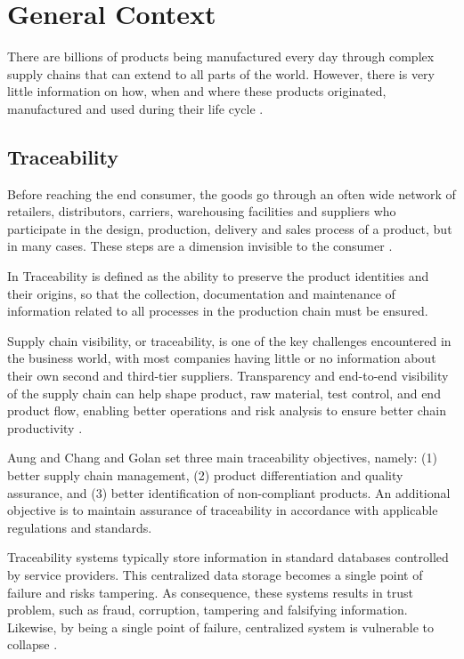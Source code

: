 \section{General Context} \label{sec:General}

There are billions of products being manufactured every day through complex supply chains that can extend to all parts of the world. However, there is very little information on how, when and where these products originated, manufactured and used during their life cycle \cite{horiuchirastreabilidade}.

\subsection{Traceability}\label{sec:traceability}

Before reaching the end consumer, the goods go through an often wide network of retailers, distributors, carriers, warehousing facilities and suppliers who participate in the design, production, delivery and sales process of a product, but in many cases. These steps are a dimension invisible to the consumer \cite{provenance2015}.

In \cite{gryna1998juran, Opara2001} Traceability is defined as the ability to preserve the product identities and their origins, so that the collection, documentation and maintenance of information related to all processes in the production chain must be ensured.

Supply chain visibility, or traceability, is one of the key challenges encountered in the business world, with most companies having little or no information about their own second and third-tier suppliers. Transparency and end-to-end visibility of the supply chain can help shape product, raw material, test control, and end product flow, enabling better operations and risk analysis to ensure better chain productivity \cite{abeyratne2016blockchain}.

Aung and Chang \cite{aung2014traceability} and Golan \cite{golan2004traceability} set three main traceability objectives, namely: (1) better supply chain management, (2) product differentiation and quality assurance, and (3) better identification of non-compliant products. An additional objective is to maintain assurance of traceability in accordance with applicable regulations and standards.

Traceability systems typically store information in standard databases controlled by service providers. This centralized data storage becomes a single point of failure and risks tampering. As consequence, these systems results in trust problem, such as fraud, corruption, tampering and falsifying information. Likewise, by being a single point of failure, centralized system is vulnerable to collapse \cite{tian2017supply}.

